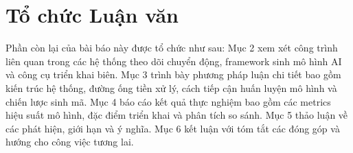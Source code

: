 \section{Tổ chức Luận văn}

Phần còn lại của bài báo này được tổ chức như sau: Mục 2 xem xét công trình liên quan trong các hệ thống theo dõi chuyển động, framework sinh mô hình AI và công cụ triển khai biên. Mục 3 trình bày phương pháp luận chi tiết bao gồm kiến trúc hệ thống, đường ống tiền xử lý, cách tiếp cận huấn luyện mô hình và chiến lược sinh mã. Mục 4 báo cáo kết quả thực nghiệm bao gồm các metrics hiệu suất mô hình, đặc điểm triển khai và phân tích so sánh. Mục 5 thảo luận về các phát hiện, giới hạn và ý nghĩa. Mục 6 kết luận với tóm tắt các đóng góp và hướng cho công việc tương lai.
